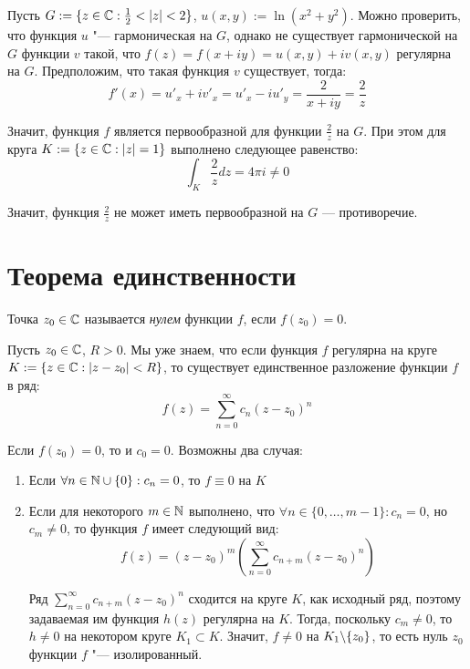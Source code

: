 \begin{example}
	Пусть $G := \{z \in \mathbb{C} : \frac12 < |z| < 2\}$, $u(x, y) := \ln(x^2 + y^2)$. Можно проверить, что функция $u$ "--- гармоническая на $G$, однако не существует гармонической на $G$ функции $v$ такой, что $f(z) = f(x + iy) = u(x, y) + iv(x, y)$ регулярна на $G$. Предположим, что такая функция $v$ существует, тогда:
	\[f'(x) = u'_x + iv'_x = u'_x - iu'_y = \frac{2}{x + iy} = \frac 2z\]
	
	Значит, функция $f$ является первообразной для функции $\frac 2z$ на $G$. При этом для круга $K := \{z \in \mathbb{C}: |z| = 1\}$ выполнено следующее равенство:
	\[\int_{K} \frac 2zdz = 4\pi i \ne 0\]
	
	Значит, функция $\frac2z$ не может иметь первообразной на $G$ --- противоречие.
\end{example}

\section{Теорема единственности}

\begin{definition}
	Точка $z_0 \in \mathbb{C}$ называется \textit{нулем} функции $f$, если $f(z_0) = 0$.
\end{definition}

\begin{note}
	Пусть $z_0 \in \mathbb{C}$, $R > 0$. Мы уже знаем, что если функция $f$ регулярна на круге $K := \{z \in \mathbb{C}: |z - z_0| < R\}$, то существует единственное разложение функции $f$ в ряд:
	\[f(z) = \sum_{n=0}^\infty c_n(z - z_0)^n\]
	
	Если $f(z_0) = 0$, то и $c_0 = 0$. Возможны два случая:
	\begin{enumerate}
		\item Если $\forall n \in \mathbb{N}\cup \{0\}: c_n = 0$, то $f \equiv 0$ на $K$
		\item Если для некоторого $m \in \mathbb{N}$ выполнено, что $\forall n \in \{0, \dotsc, m - 1\}: c_n = 0$, но $c_m \ne 0$, то функция $f$ имеет следующий вид:
		\[f(z) = (z - z_0)^m\left(\sum_{n = 0}^\infty c_{n + m}(z - z_0)^n\right)\]
		
		Ряд $\sum_{n = 0}^\infty c_{n + m}(z - z_0)^n$ сходится на круге $K$, как исходный ряд, поэтому задаваемая им функция $h(z)$ регулярна на $K$. Тогда, поскольку $c_m \ne 0$, то $h \ne 0$ на некотором круге $K_1 \subset K$. Значит, $f \ne 0$ на $K_1 \backslash \{z_0\}$, то есть нуль $z_0$ функции $f$ "--- изолированный.
	\end{enumerate}
\end{note}

